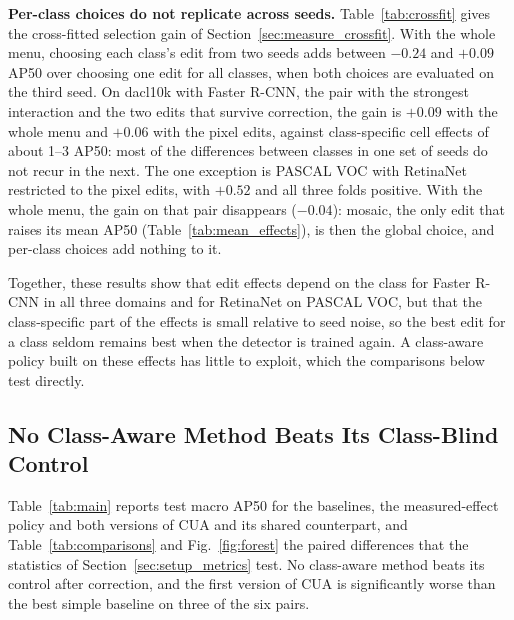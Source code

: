 \documentclass[conference]{IEEEtran}
\begin{document}
\noindent\textbf{Per-class choices do not replicate across seeds.} Table~\ref{tab:crossfit} gives the cross-fitted selection gain of Section~\ref{sec:measure_crossfit}. With the whole menu, choosing each class's edit from two seeds adds between $-0.24$ and $+0.09$ AP50 over choosing one edit for all classes, when both choices are evaluated on the third seed. On dacl10k with Faster R-CNN, the pair with the strongest interaction and the two edits that survive correction, the gain is $+0.09$ with the whole menu and $+0.06$ with the pixel edits, against class-specific cell effects of about 1--3 AP50: most of the differences between classes in one set of seeds do not recur in the next. The one exception is PASCAL VOC with RetinaNet restricted to the pixel edits, with $+0.52$ and all three folds positive. With the whole menu, the gain on that pair disappears ($-0.04$): mosaic, the only edit that raises its mean AP50 (Table~\ref{tab:mean_effects}), is then the global choice, and per-class choices add nothing to it.

Together, these results show that edit effects depend on the class for Faster R-CNN in all three domains and for RetinaNet on PASCAL VOC, but that the class-specific part of the effects is small relative to seed noise, so the best edit for a class seldom remains best when the detector is trained again. A class-aware policy built on these effects has little to exploit, which the comparisons below test directly.

\subsection{No Class-Aware Method Beats Its Class-Blind Control}
\label{sec:results_comparison}

Table~\ref{tab:main} reports test macro AP50 for the baselines, the measured-effect policy and both versions of CUA and its shared counterpart, and Table~\ref{tab:comparisons} and Fig.~\ref{fig:forest} the paired differences that the statistics of Section~\ref{sec:setup_metrics} test. No class-aware method beats its control after correction, and the first version of CUA is significantly worse than the best simple baseline on three of the six pairs.
\end{document}
